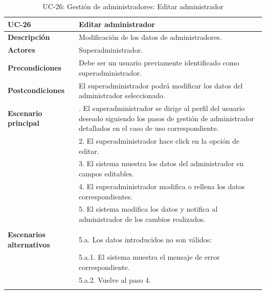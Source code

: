 \begin{table}[H]
  \begin{center}
    \begin{tabularx}{16.4cm}{|l|X|}
      \hline
      \textbf{UC-26} & \textbf{Editar administrador}\\
      \hline
      \textbf{Descripción} & Modificación de los datos de administradores.\\
      \hline
      \textbf{Actores} & Superadministrador.\\
      \hline
      \textbf{Precondiciones} & Debe ser un usuario previamente identificado como superadministrador.\\
      \hline
      \textbf{Postcondiciones} & El superadministrador podrá modificar los datos del administrador seleccionado.\\
      \hline
      \textbf{Escenario principal} & \smallskip 1. El superadministrador se dirige al perfil del usuario deseado siguiendo los pasos de gestión de administrador detallados en el caso de uso correspondiente.\\
      & 2. El superadministrador hace click en la opción de editar. \\
      & 3. El sistema muestra los datos del administrador en campos editables.\\
      & 4. El superadministrador modifica o rellena los datos correspondientes.\\
      & 5. El sistema modifica los datos y notifica al administrador de los cambios realizados.\\ 
      & \\
      \hline
      \textbf{Escenarios alternativos} & \smallskip 5.a. Los datos introducidos no son válidos:\\
      & \hspace{0.3cm} 5.a.1. El sistema muestra el mensaje de error correspondiente.\\
      & \hspace{0.3cm} 5.a.2. Vuelve al paso 4.\\
      & \\
      \hline
    \end{tabularx}
    \caption{UC-26: Gestión de administradores: Editar administrador}
    \label{tab:CU-editar-admin}
  \end{center}
\end{table}


